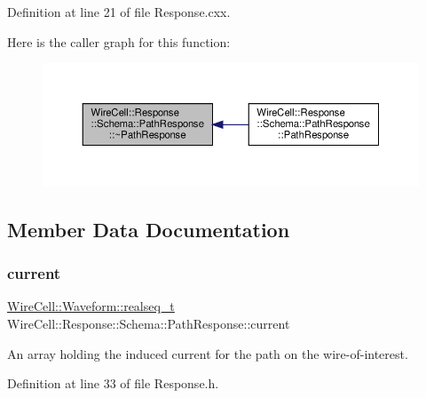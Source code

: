 Definition at line 21 of file Response.\+cxx.

Here is the caller graph for this function\+:
\nopagebreak
\begin{figure}[H]
\begin{center}
\leavevmode
\includegraphics[width=350pt]{struct_wire_cell_1_1_response_1_1_schema_1_1_path_response_a0e6677f86c80943d1c70a8a9ad1af4e1_icgraph}
\end{center}
\end{figure}


\subsection{Member Data Documentation}
\mbox{\label{struct_wire_cell_1_1_response_1_1_schema_1_1_path_response_a7345921b89c3f71394ccd990c85c3ca2}} 
\subsubsection{\texorpdfstring{current}{current}}
{\footnotesize\ttfamily \hyperlink{namespace_wire_cell_1_1_waveform_a479175e541c8545e87cd8063b74b6956}{Wire\+Cell\+::\+Waveform\+::realseq\+\_\+t} Wire\+Cell\+::\+Response\+::\+Schema\+::\+Path\+Response\+::current}



An array holding the induced current for the path on the wire-\/of-\/interest. 



Definition at line 33 of file Response.\+h.

\mbox{\label{struct_wire_cell_1_1_response_1_1_schema_1_1_path_response_aca7140e1cc69416034b6d01c34ecc780}} 
